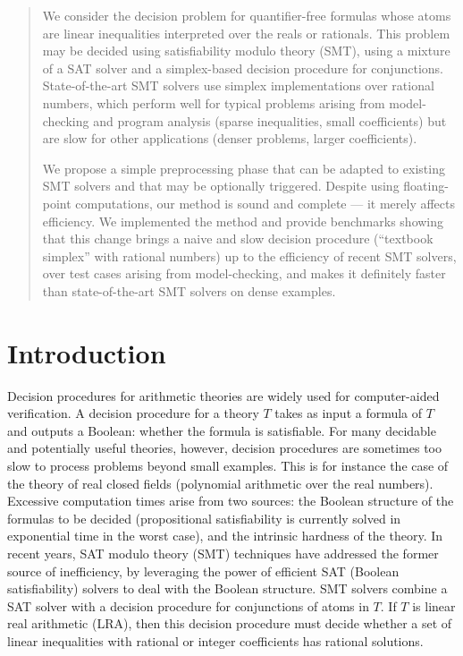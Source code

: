 \maketitle

\newcommand{\soft}[1]{\textsc{#1}}
\newcommand{\ve}[1]{\mathbf{#1}}
\newcommand{\algo}[1]{\textsc{#1}}

\begin{abstract}
We consider the decision problem for quantifier-free formulas whose atoms are linear inequalities interpreted over the reals or rationals. This problem may be decided using satisfiability modulo theory (SMT), using a mixture of a SAT solver and a simplex-based decision procedure for conjunctions. State-of-the-art SMT solvers use simplex implementations over rational numbers, which perform well for typical problems arising from model-checking and program analysis (sparse inequalities, small coefficients) but are slow for other applications (denser problems, larger coefficients).

We propose a simple preprocessing phase that can be adapted to existing SMT solvers and that may be optionally triggered. Despite using floating-point computations, our method is sound and complete --- it merely affects efficiency. We implemented the method and provide benchmarks showing that this change brings a naive and slow decision procedure (``textbook simplex'' with rational numbers) up to the efficiency of recent SMT solvers, over test cases arising from model-checking, and makes it definitely faster than state-of-the-art SMT solvers on dense examples. 
\end{abstract}
\section{Introduction}
Decision procedures for arithmetic theories are widely used for computer-aided verification. A decision procedure for a theory $T$ takes as input a formula of $T$ and outputs a Boolean: whether the formula is satisfiable. For many decidable and potentially useful theories, however, decision procedures are sometimes too slow to process problems beyond small examples. This is for instance the case of the theory of real closed fields (polynomial arithmetic over the real numbers). Excessive computation times arise from two sources: the Boolean structure of the formulas to be decided (propositional satisfiability is currently solved in exponential time in the worst case), and the intrinsic hardness of the theory. In recent years, SAT modulo theory (SMT) techniques have addressed the former source of inefficiency, by leveraging the power of efficient SAT (Boolean satisfiability) solvers to deal with the Boolean structure. SMT solvers combine a SAT solver with a decision procedure for conjunctions of atoms in $T$. If $T$ is linear real arithmetic (LRA), then this decision procedure must decide whether a set of linear inequalities with rational or integer coefficients has rational solutions.

